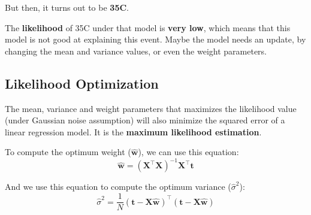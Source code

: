 \documentclass[12pt]{article}
\begin{document}
\begin{quote}
\end{quote}

But then, it turns out to be \textbf{35\textdegree C}. 
\vspace{1.0em}

\begin{tcolorbox}[colback=blue!10, colframe=blue!80!black, sharp corners, boxrule=0.4pt]
  The \textbf{likelihood} of 35\textdegree C under that model is \textbf{very low}, which means that this model is not good at explaining this event. Maybe the model needs an update, by changing the mean and variance values, or even the weight parameters.
\end{tcolorbox}

\subsection{Likelihood Optimization}
The mean, variance and weight parameters that maximizes the likelihood value (under Gaussian noise assumption) will also minimize the squared error of a linear regression model. It is the \textbf{maximum likelihood estimation}.
\vspace{1.5em}

To compute the optimum weight ($\hat{\bm{w}}$), we can use this equation:
\[
\hat{\bm{w}} = (\mathbf{X}^\top \mathbf{X})^{-1} \mathbf{X}^\top \mathbf{t}
\]

And we use this equation to compute the optimum variance ($\hat{\sigma}^2$):
\[
\hat{\sigma}^2 = \frac{1}{N} (\mathbf{t} - \mathbf{X} \hat{\bm{w}})^\top (\mathbf{t} - \mathbf{X} \hat{\bm{w}})
\]
\end{document}
